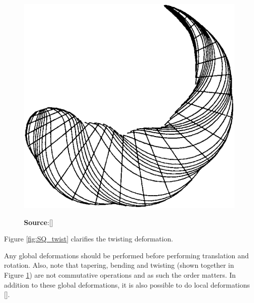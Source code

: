 \begin{figure}
\begin{minipage}[h]{0.4\textwidth}
		\includegraphics[width=1\textwidth]{import/SQ_bent_twisted_tapered}
		\label{fig:SQ_allDeform}
	\end{minipage}
	\caption{\textbf{Source}:[\citeauthor{Barr1984}]}
	\label{fig:SQ_combo}
\end{figure}
Figure \ref{fig:SQ_twist} clarifies the twisting deformation.

Any global deformations should be performed before performing translation and rotation. Also, note that tapering, bending and twisting (shown together in Figure \ref{fig:SQ_combo}) are not commutative operations and as such the order matters. In addition to these global deformations, it is also possible to do local deformations [\citeauthor{Jaklic2000}].



%
%


